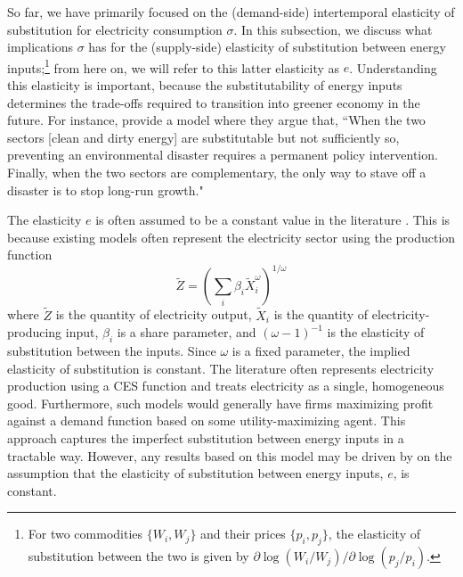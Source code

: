 \documentclass[11pt,a4paper,leqno]{extarticle}
\begin{document}
	So far, we have primarily focused on the (demand-side) intertemporal elasticity of substitution for electricity consumption $\sigma$. In this subsection, we discuss what implications $\sigma$ has for the (supply-side) elasticity of substitution between energy inputs;\footnote{
	For two commodities $\{W_i, W_j\}$ and their prices $\{p_i, p_j\}$, the elasticity of substitution between the two is given by $\partial \log (W_i/ W_j) / \partial \log (p_j/p_i)$. 
	}  from here on, we will refer to this latter elasticity as $e$. Understanding this elasticity is important, because the substitutability of energy inputs determines the trade-offs required to transition into greener economy in the future. For instance, \citet{Ace2012} provide a model where they argue that, ``When the two	sectors [clean and dirty energy] are substitutable but not sufficiently so, preventing an environmental disaster requires a permanent policy intervention. Finally, when the two sectors are complementary, the only way to stave off a disaster is to stop long-run growth."

	The elasticity $e$ is often assumed to be a constant value in the literature \citep{Pap}. This is because existing models often represent the electricity sector using the production function
	\begin{equation}
	\tilde{Z} = \left( \sum_i \beta_i \tilde{X}_i^\omega \right)^{1/\omega}
	\end{equation} 
	where   $\tilde{Z}$ is the quantity of electricity output, $\tilde{X}_i$ is the quantity of electricity-producing input, $\beta_i$ is a share parameter, and $(\omega-1)^{-1} $ is the elasticity of substitution between the inputs. Since $\omega$ is a fixed parameter, the implied elasticity of substitution is constant. The literature often represents electricity production using a CES function and treats electricity as a single, homogeneous good. Furthermore, such models would generally have firms maximizing profit against a  demand function based on some utility-maximizing agent. This approach captures the imperfect substitution between energy inputs in a tractable way. However, any results based on this model may be driven by on the assumption that the  elasticity of substitution between energy inputs, $e$, is constant. 
	
\end{document}
